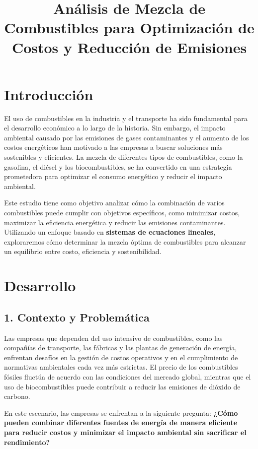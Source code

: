 \documentclass[]{article}
\title{Análisis de Mezcla de Combustibles para Optimización de Costos y Reducción de Emisiones}
\author{}
\date{}
\begin{document}
	
	\maketitle
	
	\section*{Introducción}
	El uso de combustibles en la industria y el transporte ha sido fundamental para el desarrollo económico a lo largo de la historia. Sin embargo, el impacto ambiental causado por las emisiones de gases contaminantes y el aumento de los costos energéticos han motivado a las empresas a buscar soluciones más sostenibles y eficientes. La mezcla de diferentes tipos de combustibles, como la gasolina, el diésel y los biocombustibles, se ha convertido en una estrategia prometedora para optimizar el consumo energético y reducir el impacto ambiental.
	
	Este estudio tiene como objetivo analizar cómo la combinación de varios combustibles puede cumplir con objetivos específicos, como minimizar costos, maximizar la eficiencia energética y reducir las emisiones contaminantes. Utilizando un enfoque basado en \textbf{sistemas de ecuaciones lineales}, exploraremos cómo determinar la mezcla óptima de combustibles para alcanzar un equilibrio entre costo, eficiencia y sostenibilidad.
	
	\section*{Desarrollo}
	
	\subsection*{1. Contexto y Problemática}
	Las empresas que dependen del uso intensivo de combustibles, como las compañías de transporte, las fábricas y las plantas de generación de energía, enfrentan desafíos en la gestión de costos operativos y en el cumplimiento de normativas ambientales cada vez más estrictas. El precio de los combustibles fósiles fluctúa de acuerdo con las condiciones del mercado global, mientras que el uso de biocombustibles puede contribuir a reducir las emisiones de dióxido de carbono.
	
	En este escenario, las empresas se enfrentan a la siguiente pregunta: \textbf{¿Cómo pueden combinar diferentes fuentes de energía de manera eficiente para reducir costos y minimizar el impacto ambiental sin sacrificar el rendimiento?}
	
\end{document}
